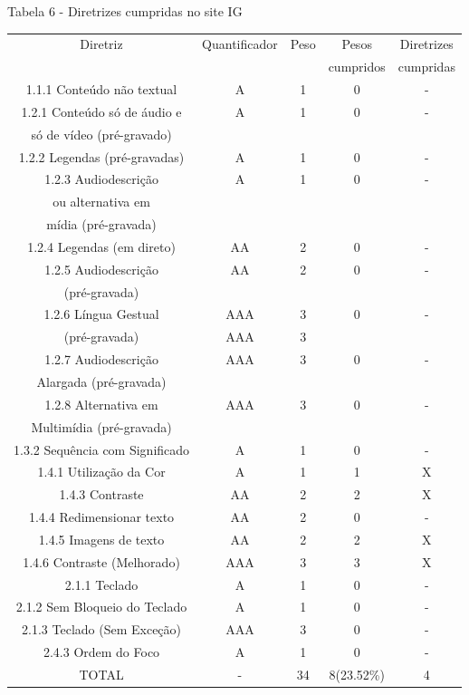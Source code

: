 \documentclass[a4paper]{article}
\begin{document}
\begin{titlepage}
Tabela 6 - Diretrizes cumpridas no site IG\\[-1cm]
\begin{center}
	\fontsize{8pt}{8pt}\selectfont	
	\begin{longtable}{|c|c|c|c|c|}
		\hline
		Diretriz & Quantificador & Peso & Pesos & Diretrizes\\
		& & & cumpridos & cumpridas\\
		\hline
		1.1.1 Conteúdo não textual & A & 1 & 0 & - \\
		\hline
		1.2.1 Conteúdo só de áudio e & A & 1 & 0 & - \\
		só de vídeo (pré-gravado) & & & & \\
		\hline
		1.2.2 Legendas (pré-gravadas) & A & 1 & 0 & - \\
		\hline
		1.2.3 Audiodescrição & A & 1 & 0 & - \\
		ou alternativa em & & & & \\
		mídia (pré-gravada) & & & & \\
		\hline
		1.2.4 Legendas (em direto) & AA & 2 & 0 & - \\
		\hline
		1.2.5 Audiodescrição & AA & 2 & 0 & - \\
		(pré-gravada) & & & & \\
		\hline
		1.2.6 Língua Gestual & AAA & 3 & 0 & - \\
		(pré-gravada) & AAA & 3 & & \\
		\hline
		1.2.7 Audiodescrição & AAA & 3 & 0 & - \\
		Alargada (pré-gravada) & & & & \\
		\hline
		1.2.8 Alternativa em & AAA & 3 & 0 & - \\
		Multimídia (pré-gravada) & & & & \\
		\hline
		1.3.2 Sequência com Significado & A & 1 & 0 & - \\
		\hline
		1.4.1 Utilização da Cor & A & 1 & 1 & X \\
		\hline
		1.4.3 Contraste & AA & 2 & 2 & X \\
		\hline
		1.4.4 Redimensionar texto & AA & 2 & 0 & - \\
		\hline
		1.4.5 Imagens de texto & AA & 2 & 2 & X \\
		\hline
		1.4.6 Contraste (Melhorado) & AAA & 3 & 3 & X \\
		\hline
		2.1.1 Teclado & A & 1 & 0 & - \\
		\hline
		2.1.2 Sem Bloqueio do Teclado & A & 1 & 0 & - \\
		\hline
		2.1.3 Teclado (Sem Exceção) & AAA & 3 & 0 & - \\
		\hline
		2.4.3 Ordem do Foco & A & 1 & 0 & - \\
		\hline
		TOTAL & - & 34 & 8(23.52\%) & 4 \\
		\hline
	\end{longtable}
\end{center}


\end{titlepage}
\end{document}
